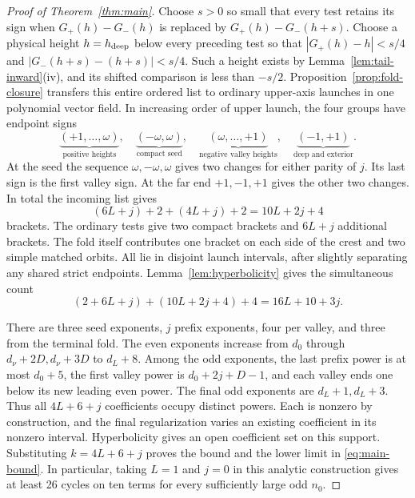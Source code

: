 \begin{proof}[Proof of Theorem~\ref{thm:main}]
Choose $s>0$ so small that every test retains its sign when
$G_+(h)-G_-(h)$ is replaced by $G_+(h)-G_-(h+s)$. Choose a physical height
$h=h_{\rm deep}$ below every preceding test so that $|G_+(h)-h|<s/4$
and $|G_-(h+s)-(h+s)|<s/4$. Such a height exists by
Lemma~\ref{lem:tail-inward}(iv), and its shifted comparison is less than $-s/2$. Proposition~\ref{prop:fold-closure}
transfers this entire ordered list to ordinary upper-axis launches in
one polynomial vector field. In increasing order of upper launch,
the four groups have endpoint signs
\[
 \underbrace{(+1,\ldots,\omega)}_{\text{positive heights}},\quad
 \underbrace{(-\omega,\omega)}_{\text{compact seed}},\quad
 \underbrace{(\omega,\ldots,+1)}_{\text{negative valley heights}},\quad
 \underbrace{(-1,+1)}_{\text{deep and exterior}} .
\]
At the seed the sequence $\omega,-\omega,\omega$ gives two changes
for either parity of $j$. Its last sign is the first valley sign.
At the far end $+1,-1,+1$ gives the other two changes. In total the
incoming list gives
\[
 (6L+j)+2+(4L+j)+2=10L+2j+4
\]
brackets. The ordinary tests give two compact brackets and $6L+j$
additional brackets. The fold itself contributes one bracket on each
side of the crest and two simple matched orbits. All lie in disjoint
launch intervals, after slightly separating any shared strict endpoints.
Lemma~\ref{lem:hyperbolicity} gives the simultaneous count
\[
 (2+6L+j)+(10L+2j+4)+4=16L+10+3j .
\]

There are three seed exponents, $j$ prefix exponents, four per valley,
and three from the terminal fold. The even exponents increase from $d_0$
through $d_\nu+2D,d_\nu+3D$ to $d_L+8$. Among the odd exponents, the
last prefix power is at most $d_0+5$, the first valley power is
$d_0+2j+D-1$, and each valley ends one below its new leading even power.
The final odd exponents are $d_L+1,d_L+3$. Thus all $4L+6+j$ coefficients
occupy distinct powers. Each is nonzero by construction, and the final
regularization varies an existing coefficient in its nonzero interval.
Hyperbolicity gives an open coefficient set on this support.
Substituting $k=4L+6+j$ proves the bound and the lower limit
in \eqref{eq:main-bound}. In particular, taking $L=1$ and $j=0$ in this
analytic construction gives at least 26 cycles on ten terms for every
sufficiently large odd $n_0$.
\end{proof}

